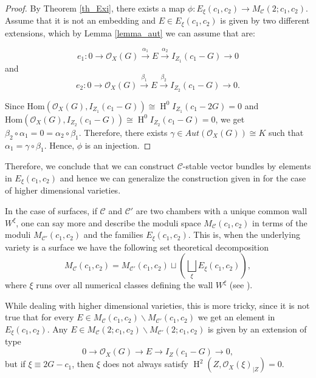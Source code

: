 \documentclass[11pt,twoside]{amsart}
\theoremstyle{definition}
\newcommand {\Hom}{\mathrm{Hom}}
\newcommand{\Ho}{\operatorname{H}}
\begin{document}
\begin{proof}
     By Theorem \ref{th_Exi}, there exists a map $\phi: E_{\xi}(c_1,c_2)\rightarrow M_\mathcal{C}(2;c_1,c_2)$. Assume that it is not an embedding and $E\in E_{\xi}(c_1,c_2)$ is given by two different extensions, which by Lemma \ref{lemma_aut} we can assume that are:

     $$e_1: 0\rightarrow \mathcal{O}_X(G)\overset{\alpha_1}{\rightarrow} E \overset{\alpha_2}{\rightarrow} I_{Z_1}(c_1-G)\rightarrow0$$
     and 
     $$e_2: 0\rightarrow \mathcal{O}_X(G)\overset{\beta_1}{\rightarrow} E \overset{\beta_2}{\rightarrow} I_{Z_2}(c_1-G)\rightarrow0.$$

     Since $\Hom(\mathcal{O}_X(G),I_{Z_1}(c_1-G))\cong \Ho^0 I_{Z_1}(c_1-2G)=0$ and $\Hom(\mathcal{O}_X(G),I_{Z_2}(c_1-G))\cong \Ho^0 I_{Z_2}(c_1-G)=0$, we get
     $
         \beta_2\circ \alpha_1= 0= \alpha_2\circ\beta_1.
     $
    Therefore, there exists $\gamma\in Aut(\mathcal{O}_X(G))\cong K$ such that $\alpha_1=\gamma\circ \beta_1$. Hence, $\phi$ is an injection.%
\end{proof}


Therefore, we conclude that we can construct $\mathcal{C}$-stable vector bundles by elements in $E_{\xi}(c_1,c_2)$ and hence we can generalize the construction given in \cite{Qin1} for the case of higher dimensional varieties.


In the case of surfaces, if $\mathcal{C}$ and $\mathcal{C}'$ are two chambers with a unique common wall $W^\xi$, one can say more and describe the moduli space $M_{\mathcal{C}}(c_1,c_2)$ in terms of the moduli $M_{\mathcal{C'}}(c_1,c_2)$ and the families $E_{\xi}(c_1,c_2)$. This is, when the underlying variety is a surface we have the following set theoretical decomposition $$M_{\mathcal{C}}(c_1,c_2)=M_{\mathcal{C}'}(c_1,c_2)\sqcup (\bigsqcup_{\xi}E_{\xi}(c_1,c_2)),$$ where $\xi$ runs over all numerical classes defining the wall $W^{\xi}$
 (see \cite[Proposition 1.3.1]{Qin1}).

 While dealing with higher dimensional varieties, this  is more tricky, since it is not true  that for every $E\in M_{\mathcal{C}}(c_1,c_2)\backslash M_{\mathcal{C}'}(c_1,c_2)$ we get an element in $E_{\xi}(c_1,c_2)$. Any $E\in M_{\mathcal{C}}(2;c_1,c_2)\backslash M_{\mathcal{C}'}(2;c_1,c_2)$ is given by an extension of type $$0\rightarrow \mathcal{O}_X(G)\rightarrow E\rightarrow I_Z(c_1-G)\rightarrow0,$$
 but if $\xi\equiv 2G-c_1$, then $\xi$ does not always  satisfy $\Ho^2(Z,\mathcal{O}_X(\xi)_{|Z})=0$.
\end{document}
